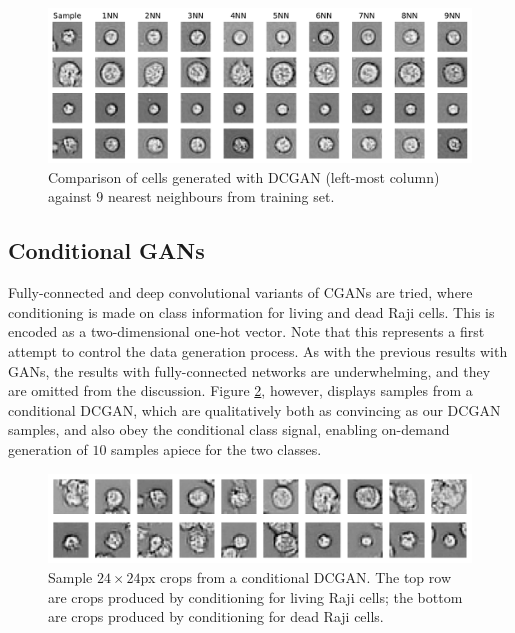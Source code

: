 \begin{figure}[h!]
\centering
\includegraphics[width=\textwidth]{img/feasibility_knn_gan.pdf}
\caption{Comparison of cells generated with DCGAN (left-most column) against $9$ nearest neighbours from training set.}
\label{fig:knn_gan}
\end{figure}

\subsection{Conditional GANs}

Fully-connected and deep convolutional variants of CGANs are tried, where conditioning is made on class information for living and dead Raji cells. This is encoded as a two-dimensional one-hot vector. Note that this represents a first attempt to control the data generation process. As with the previous results with GANs, the results with fully-connected networks are underwhelming, and they are omitted from the discussion. Figure \ref{fig:cdcgan_samples}, however, displays samples from a conditional DCGAN, which are qualitatively both as convincing as our DCGAN samples, and also obey the conditional class signal, enabling on-demand generation of $10$ samples apiece for the two classes.

\begin{figure}[h!]
\centering
\includegraphics[width=\textwidth]{img/feasibility_cdcgan_samples.pdf}
\caption{Sample $24\times 24$px crops from a conditional DCGAN. The top row are crops produced by conditioning for living Raji cells; the bottom are crops produced by conditioning for dead Raji cells.}
\label{fig:cdcgan_samples}
\end{figure}

